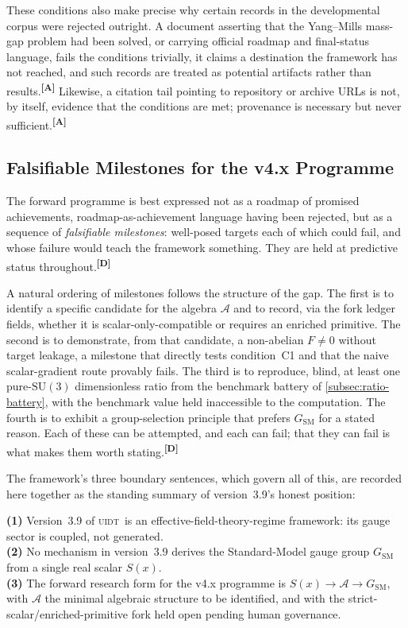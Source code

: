 \documentclass[12pt,a4paper,twoside]{article}
\theoremstyle{plain}
\theoremstyle{definition}
\theoremstyle{remark}
\newcommand{\UIDT}{\textsc{uidt}}
\newcommand{\catmark}[1]{\textsuperscript{\textsf{\textbf{[#1]}}}}
\begin{document}
These conditions also make precise why certain records in the developmental corpus were rejected outright. A document asserting that the Yang--Mills mass-gap problem had been solved, or carrying official roadmap and final-status language, fails the conditions trivially, it claims a destination the framework has not reached, and such records are treated as potential artifacts rather than results.\catmark{A} Likewise, a citation tail pointing to repository or archive URLs is not, by itself, evidence that the conditions are met; provenance is necessary but never sufficient.\catmark{A}

\subsection{Falsifiable Milestones for the v4.x Programme}
\label{subsec:v4-milestones}

The forward programme is best expressed not as a roadmap of promised achievements, roadmap-as-achievement language having been rejected, but as a sequence of \emph{falsifiable milestones}: well-posed targets each of which could fail, and whose failure would teach the framework something. They are held at predictive status throughout.\catmark{D}

A natural ordering of milestones follows the structure of the gap. The first is to identify a specific candidate for the algebra $\mathcal{A}$ and to record, via the fork ledger fields, whether it is scalar-only-compatible or requires an enriched primitive. The second is to demonstrate, from that candidate, a non-abelian $F \neq 0$ without target leakage, a milestone that directly tests condition~C1 and that the naive scalar-gradient route provably fails. The third is to reproduce, blind, at least one pure-$\mathrm{SU}(3)$ dimensionless ratio from the benchmark battery of \cref{subsec:ratio-battery}, with the benchmark value held inaccessible to the computation. The fourth is to exhibit a group-selection principle that prefers $G_{\mathrm{SM}}$ for a stated reason. Each of these can be attempted, and each can fail; that they can fail is what makes them worth stating.\catmark{D}

The framework's three boundary sentences, which govern all of this, are recorded here together as the standing summary of version~3.9's honest position:

\begin{governancebox}
\textbf{(1)} Version~3.9 of \UIDT\ is an effective-field-theory-regime framework:
its gauge sector is coupled, not generated.\\[0.3em]
\textbf{(2)} No mechanism in version~3.9 derives the Standard-Model gauge group
$G_{\mathrm{SM}}$ from a single real scalar $S(x)$.\\[0.3em]
\textbf{(3)} The forward research form for the v4.x programme is $S(x)\to\mathcal{A}\to G_{\mathrm{SM}}$, with $\mathcal{A}$ the minimal algebraic structure to be identified, and with the strict-scalar/enriched-primitive fork held open pending human governance.
\end{governancebox}
\end{document}

